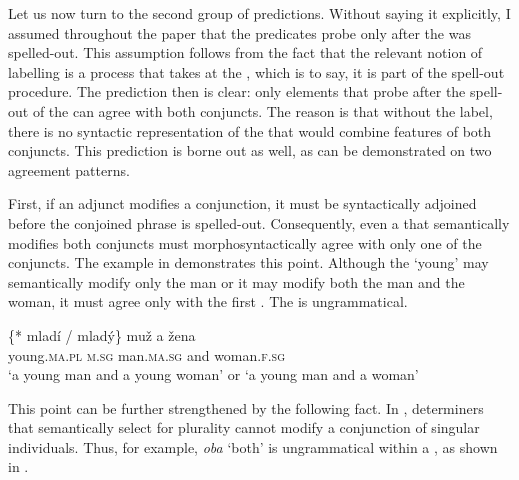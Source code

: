 \documentclass[output=paper,modfontsnewtxmath,hidelinks]{langscibook}
\begin{document}
\z

\noindent Let us now turn to the second group of predictions. Without saying it explicitly, I assumed throughout the paper that the predicates probe only after the  was spelled-out. This assumption follows from the fact that the relevant notion of labelling is a process that takes at the , which is to say, it is part of the spell-out procedure. The prediction then is clear: only elements that probe after the spell-out of the  can agree with both conjuncts. The reason is that without the label, there is no syntactic representation of the  that would combine features of both conjuncts. This prediction is borne out as well, as can be demonstrated on two agreement patterns.

First, if an  adjunct modifies a conjunction, it must be syntactically adjoined before the conjoined phrase is spelled-out. Consequently, even a  that semantically modifies both conjuncts must morphosyntactically agree with only one of the conjuncts. The example in  demonstrates this point. Although the  `young' may semantically modify only the man or it may modify both the man and the woman, it must agree only with the first . The  is ungrammatical.


\ea\gll \{*\hspace{-2pt} mladí / mladý\} muž a žena\label{adjunct}\\
{} young.\textsc{ma.pl} {} \textsc{m.sg} man.\textsc{ma.sg} and woman.\textsc{f.sg}\\
\glt `a young man and a young woman' or `a young man and a woman'
\z

\noindent This point can be further strengthened by the following fact. In , determiners that semantically select for plurality cannot modify a conjunction of singular individuals. Thus, for example, \textit{oba} `both' is ungrammatical within a , as shown in .

\z
\end{document}
